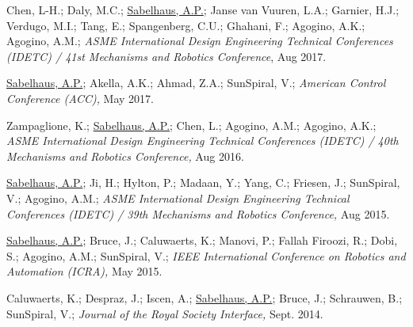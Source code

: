 \documentclass[letterpaper]{deedy-resume} %
\begin{document}

\begin{etaremune}

\item {} Chen, L-H.;  Daly, M.C.; \underline{Sabelhaus, A.P.}; Janse van Vuuren, L.A.; Garnier, H.J.; Verdugo, M.I.; Tang, E.; Spangenberg, C.U.; Ghahani, F.; Agogino, A.K.; Agogino, A.M.; {\it ASME International Design Engineering Technical Conferences (IDETC) / 41st Mechanisms and Robotics Conference}, Aug 2017.
  
\item {} \underline{Sabelhaus, A.P.}; Akella, A.K.; Ahmad, Z.A.; SunSpiral, V.; {\it American Control Conference (ACC),} May 2017.
  
\item {} Zampaglione, K.; \underline{Sabelhaus, A.P.};  Chen, L.;  Agogino, A.M.;  Agogino, A.K.;  {\it ASME International Design Engineering Technical Conferences (IDETC) / 40th Mechanisms and Robotics Conference,} Aug 2016.
  
\item {} \underline{Sabelhaus, A.P.}; Ji, H.; Hylton, P.; Madaan, Y.; Yang, C.; Friesen, J.; SunSpiral, V.; Agogino, A.M.; {\it ASME International Design Engineering Technical Conferences (IDETC) / 39th Mechanisms and Robotics Conference,} Aug 2015.

\item {} \underline{Sabelhaus, A.P.}; Bruce, J.; Caluwaerts, K.; Manovi, P.; Fallah Firoozi, R.; Dobi, S.; Agogino, A.M.; SunSpiral, V.; {\it IEEE International Conference on Robotics and Automation (ICRA),} May 2015.

\item {} Caluwaerts, K.; Despraz, J.; Iscen, A.; \underline{Sabelhaus, A.P.}; Bruce, J.; Schrauwen, B.; SunSpiral, V.;  {\it Journal of the Royal Society Interface,} Sept. 2014.


\end{etaremune}
\end{document}
